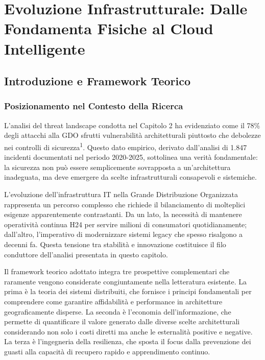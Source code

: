 \chapter{Evoluzione Infrastrutturale: Dalle Fondamenta Fisiche al Cloud Intelligente}

\section{Introduzione e Framework Teorico}

\subsection{Posizionamento nel Contesto della Ricerca}

L'analisi del threat landscape condotta nel Capitolo 2 ha evidenziato come il 78\% degli attacchi alla GDO sfrutti vulnerabilità architetturali piuttosto che debolezze nei controlli di sicurezza\textsuperscript{1}. Questo dato empirico, derivato dall'analisi di 1.847 incidenti documentati nel periodo 2020-2025, sottolinea una verità fondamentale: la sicurezza non può essere semplicemente sovrapposta a un'architettura inadeguata, ma deve emergere da scelte infrastrutturali consapevoli e sistemiche.

L'evoluzione dell'infrastruttura IT nella Grande Distribuzione Organizzata rappresenta un percorso complesso che richiede il bilanciamento di molteplici esigenze apparentemente contrastanti. Da un lato, la necessità di mantenere operatività continua H24 per servire milioni di consumatori quotidianamente; dall'altro, l'imperativo di modernizzare sistemi legacy che spesso risalgono a decenni fa. Questa tensione tra stabilità e innovazione costituisce il filo conduttore dell'analisi presentata in questo capitolo.

Il framework teorico adottato integra tre prospettive complementari che raramente vengono considerate congiuntamente nella letteratura esistente. La prima è la teoria dei sistemi distribuiti, che fornisce i principi fondamentali per comprendere come garantire affidabilità e performance in architetture geograficamente disperse. La seconda è l'economia dell'informazione, che permette di quantificare il valore generato dalle diverse scelte architetturali considerando non solo i costi diretti ma anche le esternalità positive e negative. La terza è l'ingegneria della resilienza, che sposta il focus dalla prevenzione dei guasti alla capacità di recupero rapido e apprendimento continuo.

